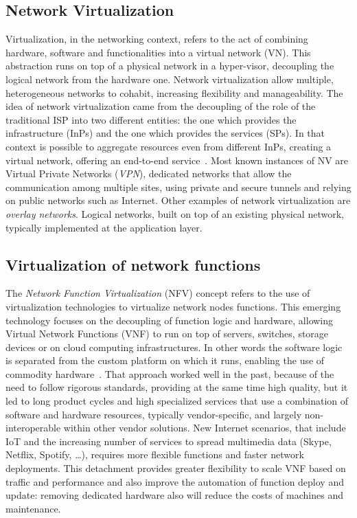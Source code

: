 \subsection{Network Virtualization}
Virtualization, in the networking context, refers to the act of combining
hardware, software and functionalities into a virtual network (VN). This
abstraction runs on top of a physical network in a hyper-visor, decoupling
the logical network from the hardware one. Network virtualization allow
multiple, heterogeneous networks to cohabit, increasing flexibility and
manageability. The idea of network virtualization came from the decoupling of
the role of the traditional ISP into two different entities: the one which
provides the infrastructure (InPs) and the one which provides the services
(SPs). In that context is possible to aggregate resources even from different
InPs, creating a virtual network, offering an end-to-end
service~\cite{chowdhury2009network}. Most known instances of NV are Virtual
Private Networks (\emph{VPN}), dedicated networks that allow the communication
among multiple sites, using private and secure tunnels and relying on public
networks such as Internet. Other examples of network virtualization are 
\emph{overlay networks}. Logical networks, built on top of an
existing physical network, typically implemented at the application layer.

\subsection{Virtualization of network functions}
The \emph{Network Function Virtualization} (NFV) concept refers to the use of
virtualization technologies to virtualize network nodes functions. This emerging
technology focuses on the decoupling of function logic and hardware, allowing
Virtual Network Functions (VNF) to run on top of servers, switches, storage
devices or on cloud computing infrastructures. In other words the software logic
is separated from the custom platform on which it runs, enabling the use of
commodity hardware~\cite{gray2016network}. That approach worked well in the
past, because of the need to follow rigorous standards, providing at the same
time high quality, but it led to long product cycles and high specialized
services that use a combination of software and hardware resources, typically
vendor-specific, and largely non-interoperable within other vendor
solutions. New Internet scenarios, that include IoT and the increasing number of
services to spread multimedia data (Skype, Netflix, Spotify, \dots), requires
more flexible functions and faster network deployments. This detachment provides
greater flexibility to scale VNF based on traffic and performance and also
improve the automation of function deploy and update: removing dedicated
hardware also will reduce the costs of machines and maintenance.

